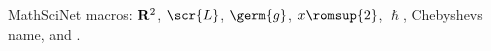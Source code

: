 \documentclass{article}
\begin{document}
MathSciNet macros: $\bold{R}^2$, $\scr{L}$, $\germ{g}$, $x\romsup{2}$, $\hslash$, Chebyshev\cprime{}s name, and .
\end{document}
